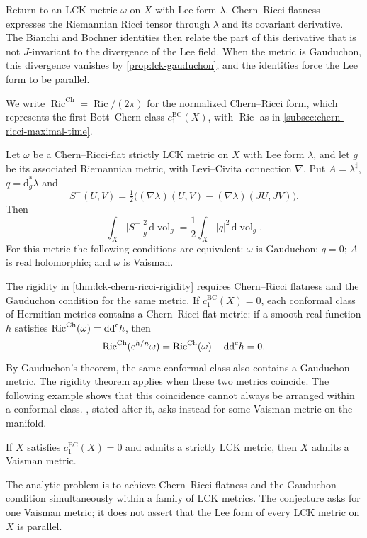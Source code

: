 Return to an LCK metric $\omega$ on $X$ with Lee form $\lambda$. Chern--Ricci flatness expresses the Riemannian Ricci tensor through $\lambda$ and its covariant derivative. The Bianchi and Bochner identities then relate the part of this derivative that is not $J$-invariant to the divergence of the Lee field. When the metric is Gauduchon, this divergence vanishes by \cref{prop:lck-gauduchon}, and the identities force the Lee form to be parallel.

We write $\operatorname{Ric}^{\mathrm{Ch}}=\operatorname{Ric}/(2\pi)$ for the normalized Chern--Ricci form, which represents the first Bott--Chern class $c_1^{\mathrm{BC}}(X)$, with $\operatorname{Ric}$ as in \cref{subsec:chern-ricci-maximal-time}.

\begin{theorem}\label{thm:lck-chern-ricci-rigidity}
Let $\omega$ be a Chern--Ricci-flat strictly LCK metric on $X$ with Lee form $\lambda$, and let $g$ be its associated Riemannian metric, with Levi--Civita connection $\nabla$. Put $A=\lambda^\sharp$, $q=\mathrm d_g^*\lambda$ and
\[
 S^-(U,V)=\tfrac12\bigl((\nabla\lambda)(U,V)-(\nabla\lambda)(JU,JV)\bigr).
\]
Then
\[
 \int_X|S^-|_g^2\,\mathrm d\operatorname{vol}_g
       =\frac12\int_X|q|^2\,\mathrm d\operatorname{vol}_g.
\]
For this metric the following conditions are equivalent: $\omega$ is Gauduchon; $q=0$; $A$ is real holomorphic; and $\omega$ is Vaisman.
\end{theorem}



The rigidity in \cref{thm:lck-chern-ricci-rigidity} requires Chern--Ricci flatness and the Gauduchon condition for the same metric. If $c_1^{\mathrm{BC}}(X)=0$, each conformal class of Hermitian metrics contains a Chern--Ricci-flat metric: if a smooth real function $h$ satisfies $\operatorname{Ric}^{\mathrm{Ch}}(\omega)=\mathrm{dd}^{\mathrm{c}} h$, then
\[
 \operatorname{Ric}^{\mathrm{Ch}}(\mathrm{e}^{h/n}\omega)
 =\operatorname{Ric}^{\mathrm{Ch}}(\omega)-\mathrm{dd}^{\mathrm{c}} h=0.
\]
By Gauduchon's theorem, the same conformal class also contains a Gauduchon metric. The rigidity theorem applies when these two metrics coincide. The following example shows that this coincidence cannot always be arranged within a conformal class. , stated after it, asks instead for some Vaisman metric on the manifold.



\begin{conjecture}\label{conj:lck-calabi-yau-vaisman}
If $X$ satisfies $c_1^{\mathrm{BC}}(X)=0$ and admits a strictly LCK metric, then $X$ admits a Vaisman metric.
\end{conjecture}

The analytic problem is to achieve Chern--Ricci flatness and the Gauduchon condition simultaneously within a family of LCK metrics. The conjecture asks for one Vaisman metric; it does not assert that the Lee form of every LCK metric on $X$ is parallel.



